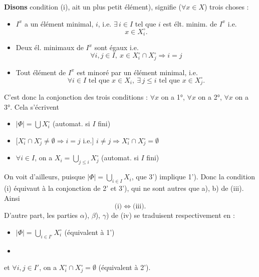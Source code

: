 \documentclass[11pt,a4paper]{article}
\begin{document}
\textbf{Disons}  condition (i),    ait un plus
petit élément), signifie ($\forall x \in X$) trois choses   :
\begin{itemize}
  \item[1°)] $I^x$ a un élément minimal, $i$, i.e. $\exists\, i \in I$ tel que
  \struck{\ill{}} $i$ est élt. minim. de $I^x$ i.e.
  \[
  x \in X_i^\circ .
  \]
  \item[2°)] Deux él. minimaux de $I^x$ sont égaux i.e.
  \[
  \forall i, j \in I,\ x \in X_i^\circ \cap X_j^\circ \Longrightarrow i = j
  \]
  \item[3°)] Tout élément de $I^x$ est minoré par un élément minimal,
  \struck{\ill{}} i.e.
  \[
  \forall i \in I \text{ tel que } x \in X_i,\ \exists\, j \leq i \text{ tel que } x \in X_j^\circ .
  \]
\end{itemize}
C'est donc la conjonction des trois conditions : $\forall x$ on a 1°,
$\forall x$ on a 2°, $\forall x$ on a 3°. Cela s'écrivent
\begin{itemize}
  \item[1')] $|\Phi| = \bigcup X_i^\circ$ \quad (automat. si $I$ fini)
  \item[2')] $\big[X_i^\circ \cap X_j^\circ \neq \emptyset \Rightarrow i = j$ i.e.$\big]$ $i \neq j \Longrightarrow X_i^\circ \cap X_j^\circ = \emptyset$
  \item[3')] $\forall i \in I$, on a $X_i = \bigcup_{j \leq i} X_j^\circ$ \quad (automat. si $I$ fini)
\end{itemize}
On voit d'ailleurs, puisque $|\Phi| = \bigcup_{i \in I} X_i$, que 3') implique
1'). Donc la condition (i) équivaut à la conjonction de 2' et 3'), qui ne sont
autres que a), b) de (iii). Ainsi
\[
\text{(i)} \Longleftrightarrow \text{(iii)} .
\]
D'autre part, les parties $\alpha$), $\beta$), $\gamma$) de (iv) se
traduisent respectivement en :
\begin{itemize}
  \item[1'')] $|\Phi| = \bigcup_{i \in I'} X_i^\circ$ \quad (équivalent à 1') 
  \item[\struck{2'')}] 
\end{itemize}
et $\forall i, j \in I'$,  on a
$X_i^\circ \cap X_j^\circ = \emptyset$ (équivalent à 2').
\end{document}
